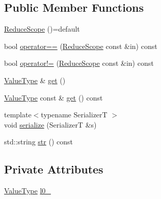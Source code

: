 \subsection*{Public Member Functions}
\begin{DoxyCompactItemize}
\item 
\hyperlink{structvt_1_1collective_1_1reduce_1_1detail_1_1_reduce_scope_ac1da975b48590fd29147a12ef1be3e56}{Reduce\+Scope} ()=default
\item 
bool \hyperlink{structvt_1_1collective_1_1reduce_1_1detail_1_1_reduce_scope_ae10b3887779309ee627921c794b0c4de}{operator==} (\hyperlink{structvt_1_1collective_1_1reduce_1_1detail_1_1_reduce_scope}{Reduce\+Scope} const \&in) const
\item 
bool \hyperlink{structvt_1_1collective_1_1reduce_1_1detail_1_1_reduce_scope_ac5023740d97cfbe4e617bc09e78a23d5}{operator!=} (\hyperlink{structvt_1_1collective_1_1reduce_1_1detail_1_1_reduce_scope}{Reduce\+Scope} const \&in) const
\item 
\hyperlink{structvt_1_1collective_1_1reduce_1_1detail_1_1_reduce_scope_a7abcfd8ab86f38734725fe77455e4838}{Value\+Type} \& \hyperlink{structvt_1_1collective_1_1reduce_1_1detail_1_1_reduce_scope_aaceb69a568f8a644c99b4cdd0769abab}{get} ()
\item 
\hyperlink{structvt_1_1collective_1_1reduce_1_1detail_1_1_reduce_scope_a7abcfd8ab86f38734725fe77455e4838}{Value\+Type} const  \& \hyperlink{structvt_1_1collective_1_1reduce_1_1detail_1_1_reduce_scope_a8eb7250d0fc83b45fa318f91bde27045}{get} () const
\item 
{\footnotesize template$<$typename SerializerT $>$ }\\void \hyperlink{structvt_1_1collective_1_1reduce_1_1detail_1_1_reduce_scope_a4b8b74530ce615997bec278690c12be8}{serialize} (SerializerT \&s)
\item 
std\+::string \hyperlink{structvt_1_1collective_1_1reduce_1_1detail_1_1_reduce_scope_a8fbbaff85c592424bedc8daf5fce7e02}{str} () const
\end{DoxyCompactItemize}
\subsection*{Private Attributes}
\begin{DoxyCompactItemize}
\item 
\hyperlink{structvt_1_1collective_1_1reduce_1_1detail_1_1_reduce_scope_a7abcfd8ab86f38734725fe77455e4838}{Value\+Type} \hyperlink{structvt_1_1collective_1_1reduce_1_1detail_1_1_reduce_scope_ab0e1e9603e220a5ad22e2b664ddcf050}{l0\+\_\+}
\end{DoxyCompactItemize}
